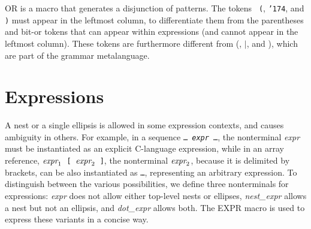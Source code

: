 \documentclass{article}
\newcommand{\mita}[1]{\mbox{\it{{#1}}}}
\newcommand{\mtt}[1]{\mbox{\tt{{#1}}}}
\newcommand{\mth}[1]{\({#1}\)}
\newcommand{\ttmid}{\mbox{\tt \char'174}}
\begin{document}

\noindent
OR is a macro that generates a disjunction of patterns.  The tokens {\tt
(}, {\ttmid}, and {\tt )} must appear in the leftmost column, to
differentiate them from the parentheses and bit-or tokens that can appear
within expressions (and cannot appear in the leftmost column).  These
tokens are furthermore different from (, \(\mid\), and ), which are part of
the grammar metalanguage.

\section{Expressions}

A nest or a single ellipsis is allowed in some expression contexts, and
causes ambiguity in others.  For example, in a sequence \mtt{\ldots
\mita{expr} \ldots}, the nonterminal \mita{expr} must be instantiated as an
explicit C-language expression, while in an array reference,
\mtt{\mth{\mita{expr}_1} \mtt{[} \mth{\mita{expr}_2} \mtt{]}}, the
nonterminal \mth{\mita{expr}_2}, because it is delimited by brackets, can
be also instantiated as \mtt{\ldots}, representing an arbitrary expression.  To
distinguish between the various possibilities, we define three nonterminals
for expressions: {\em expr} does not allow either top-level nests or
ellipses, {\em nest\_expr} allows a nest but not an ellipsis, and {\em
dot\_expr} allows both.  The EXPR macro is used to express these variants
in a concise way.

\begin{grammar}
  \CASE{}
  
\end{grammar}
\end{document}
